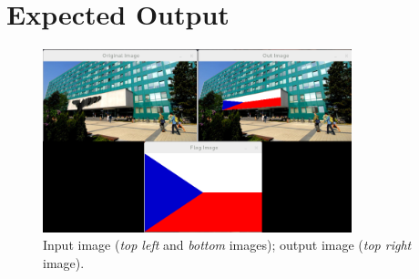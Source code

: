 \documentclass[12pt]{article}
\begin{document}
\newpage

\FloatBarrier
\section*{Expected Output}

\begin{figure}[h]
    \centering
    \includegraphics[width=0.8\textwidth]{persp_proj.png}
    \caption{Input image (\textit{top left} and \textit{bottom} images); output image (\textit{top right} image).}
    \label{fig:result}
\end{figure}
\end{document}
